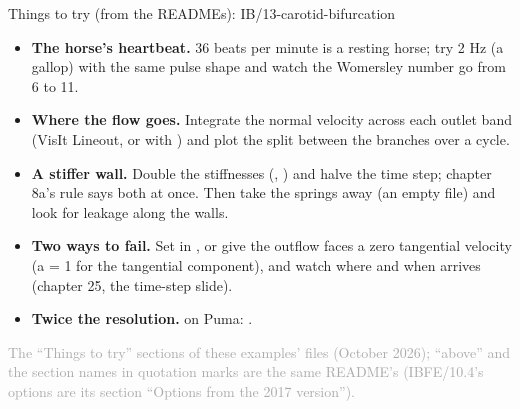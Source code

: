 \documentclass[aspectratio=169,11pt]{beamer}
\newcommand{\sourcecredit}[1]{\vfill\begin{flushright}\tiny\textcolor{DarkGray}{#1}\end{flushright}}
\begin{document}
\begin{frame}{Things to try (from the READMEs): IB/13-carotid-bifurcation}
\scriptsize\setlength{\leftmargini}{5em}
\begin{itemize}\setlength{\itemsep}{1pt}
  \item[IB/13.1] \textbf{The horse's heartbeat.} 36 beats per minute is a resting horse; try 2 Hz (a gallop) with the same pulse shape and watch the Womersley number go from 6 to 11.
  \item[IB/13.2] \textbf{Where the flow goes.} Integrate the normal velocity across each outlet band (VisIt Lineout, or  with ) and plot the split between the branches over a cycle.
  \item[IB/13.3] \textbf{A stiffer wall.} Double the stiffnesses (, ) and halve the time step; chapter 8a's rule says both at once. Then take the springs away (an empty  file) and look for leakage along the walls.
  \item[IB/13.4] \textbf{Two ways to fail.} Set  in , or give the outflow faces a zero tangential velocity (a = 1 for the tangential component), and watch where and when  arrives (chapter 25, the time-step slide).
  \item[IB/13.5] \textbf{Twice the resolution.}  on Puma: .
\end{itemize}
\sourcecredit{The ``Things to try'' sections of these examples' \code{README.md} files (October 2026); ``above'' and the section names in quotation marks are the same README's (IBFE/10.4's options are its section ``Options from the 2017 version'').}
\end{frame}
\end{document}
